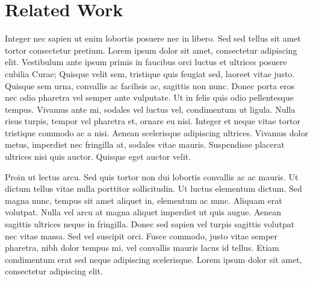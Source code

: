 \chapter{Related Work}
Integer nec sapien ut enim lobortis posuere nec in libero. Sed sed tellus sit amet tortor consectetur pretium. Lorem ipsum dolor sit amet, consectetur adipiscing elit. Vestibulum ante ipsum primis in faucibus orci luctus et ultrices posuere cubilia Curae; Quisque velit sem, tristique quis feugiat sed, laoreet vitae justo. Quisque sem urna, convallis ac facilisis ac, sagittis non nunc. Donec porta eros nec odio pharetra vel semper ante vulputate. Ut in felis quis odio pellentesque tempus. Vivamus ante mi, sodales vel luctus vel, condimentum ut ligula. Nulla risus turpis, tempor vel pharetra et, ornare eu nisi. Integer et neque vitae tortor tristique commodo ac a nisi. Aenean scelerisque adipiscing ultrices. Vivamus dolor metus, imperdiet nec fringilla at, sodales vitae mauris. Suspendisse placerat ultrices nisi quis auctor. Quisque eget auctor velit.

Proin ut lectus arcu. Sed quis tortor non dui lobortis convallis ac ac mauris. Ut dictum tellus vitae nulla porttitor sollicitudin. Ut luctus elementum dictum. Sed magna nunc, tempus sit amet aliquet in, elementum ac nunc. Aliquam erat volutpat. Nulla vel arcu at magna aliquet imperdiet ut quis augue. Aenean sagittis ultrices neque in fringilla. Donec sed sapien vel turpis sagittis volutpat nec vitae massa. Sed vel suscipit orci. Fusce commodo, justo vitae semper pharetra, nibh dolor tempus mi, vel convallis mauris lacus id tellus. Etiam condimentum erat sed neque adipiscing scelerisque. Lorem ipsum dolor sit amet, consectetur adipiscing elit.